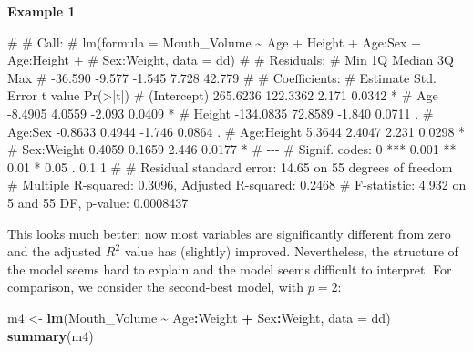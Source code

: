 \documentclass[
  a4paper,
]{article}
\newenvironment{Shaded}{\begin{snugshade}}{\end{snugshade}}
\newcommand{\AttributeTok}[1]{\textcolor[rgb]{0.13,0.29,0.53}{#1}}
\newcommand{\FunctionTok}[1]{\textcolor[rgb]{0.13,0.29,0.53}{\textbf{#1}}}
\newcommand{\NormalTok}[1]{#1}
\newcommand{\OtherTok}[1]{\textcolor[rgb]{0.56,0.35,0.01}{#1}}
\newcommand{\SpecialCharTok}[1]{\textcolor[rgb]{0.81,0.36,0.00}{\textbf{#1}}}
\theoremstyle{definition}
\theoremstyle{definition}
\newtheorem{example}{Example}[section]
\theoremstyle{definition}
\theoremstyle{definition}
\theoremstyle{remark}
\begin{document}
\begin{example}
\begin{Shaded}
\begin{Highlighting}[]
\NormalTok{\# }
\NormalTok{\# Call:}
\NormalTok{\# lm(formula = Mouth\_Volume \textasciitilde{} Age + Height + Age:Sex + Age:Height + }
\NormalTok{\#     Sex:Weight, data = dd)}
\NormalTok{\# }
\NormalTok{\# Residuals:}
\NormalTok{\#     Min      1Q  Median      3Q     Max }
\NormalTok{\# {-}36.590  {-}9.577  {-}1.545   7.728  42.779 }
\NormalTok{\# }
\NormalTok{\# Coefficients:}
\NormalTok{\#              Estimate Std. Error t value Pr(\textgreater{}|t|)  }
\NormalTok{\# (Intercept)  265.6236   122.3362   2.171   0.0342 *}
\NormalTok{\# Age           {-}8.4905     4.0559  {-}2.093   0.0409 *}
\NormalTok{\# Height      {-}134.0835    72.8589  {-}1.840   0.0711 .}
\NormalTok{\# Age:Sex       {-}0.8633     0.4944  {-}1.746   0.0864 .}
\NormalTok{\# Age:Height     5.3644     2.4047   2.231   0.0298 *}
\NormalTok{\# Sex:Weight     0.4059     0.1659   2.446   0.0177 *}
\NormalTok{\# {-}{-}{-}}
\NormalTok{\# Signif. codes:  0 \textquotesingle{}***\textquotesingle{} 0.001 \textquotesingle{}**\textquotesingle{} 0.01 \textquotesingle{}*\textquotesingle{} 0.05 \textquotesingle{}.\textquotesingle{} 0.1 \textquotesingle{} \textquotesingle{} 1}
\NormalTok{\# }
\NormalTok{\# Residual standard error: 14.65 on 55 degrees of freedom}
\NormalTok{\# Multiple R{-}squared:  0.3096,  Adjusted R{-}squared:  0.2468 }
\NormalTok{\# F{-}statistic: 4.932 on 5 and 55 DF,  p{-}value: 0.0008437}
\end{Highlighting}
\end{Shaded}

This looks much better: now most variables are significantly different from
zero and the adjusted \(R^2\) value has (slightly) improved. Nevertheless,
the structure of the model seems hard to explain and the model seems
difficult to interpret. For comparison, we consider the second-best
model, with \(p=2\):

\begin{Shaded}
\begin{Highlighting}[]
\NormalTok{m4 }\OtherTok{\textless{}{-}} \FunctionTok{lm}\NormalTok{(Mouth\_Volume }\SpecialCharTok{\textasciitilde{}}\NormalTok{ Age}\SpecialCharTok{:}\NormalTok{Weight }\SpecialCharTok{+}\NormalTok{ Sex}\SpecialCharTok{:}\NormalTok{Weight, }\AttributeTok{data =}\NormalTok{ dd)}
\FunctionTok{summary}\NormalTok{(m4)}
\end{Highlighting}
\end{Shaded}


\end{example}
\end{document}
